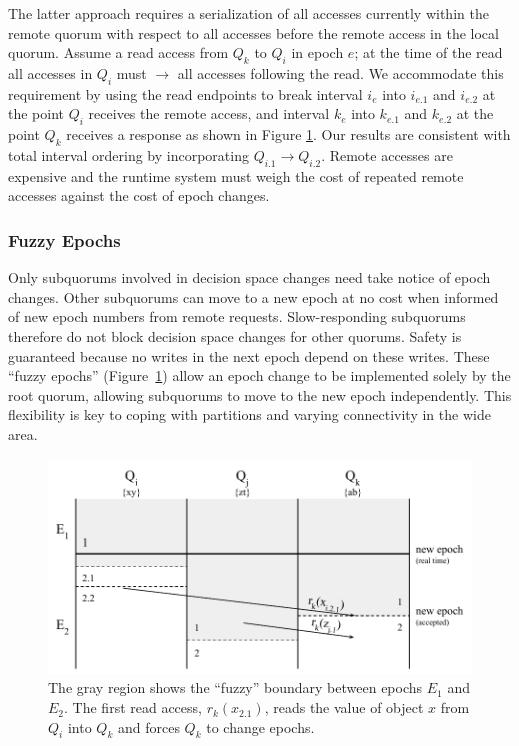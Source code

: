 \documentclass[sigconf]{acmart}
\begin{document}
The latter approach requires a serialization of all accesses currently within the remote
quorum with respect to all accesses before the remote access in the local quorum.
Assume a read access from $Q_k$ to $Q_i$ in epoch $e$; at the time of the read all
accesses in $Q_i$ must $\rightarrow$ all accesses following the read.
We accommodate this requirement by using the read endpoints to break interval $i_e$ into
$i_{e.1}$ and $i_{e.2}$ at the point $Q_i$ receives the remote access, and interval $k_e$
into $k_{e.1}$ and $k_{e.2}$ at the point $Q_k$ receives a response as shown in
Figure \ref{fig:fuzzy}.
Our results are consistent with total interval ordering by incorporating $Q_{i.1}
\rightarrow Q_{i.2}$.
Remote accesses are expensive and the runtime system must weigh the cost of repeated
remote accesses against the cost of epoch changes.

\subsubsection{Fuzzy Epochs}

Only subquorums involved in decision space changes need take notice of
epoch changes.
Other subquorums can move to a new epoch at no cost when informed of new epoch
numbers from remote requests.
Slow-responding subquorums therefore do not block decision space changes for other
quorums.
Safety is guaranteed because no writes in the next epoch depend on these writes.
These ``fuzzy epochs'' (Figure~\ref{fig:fuzzy}) allow an epoch change to be implemented solely by the
root quorum, allowing subquorums to move to the new epoch independently.
This flexibility is key to coping with partitions and varying connectivity in
the wide area.

\begin{figure}[t]
    \centering
    \includegraphics[height=0.2\textheight]{figures/fuzzy}
    \caption{The gray region shows the ``fuzzy'' boundary between epochs $E_1$
      and $E_2$. The first read access, $r_k(x_{2.1})$, reads the value of object $x$ from $Q_i$ into
      $Q_k$ and forces $Q_k$ to change epochs.}
    \label{fig:fuzzy}
\end{figure}
\end{document}
